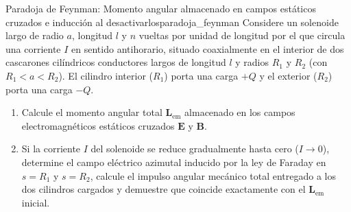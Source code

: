 \documentclass[11pt,a4paper]{book}
\newcommand{\Evec}{\bm{E}}
\newcommand{\Bvec}{\bm{B}}
\begin{document}
\begin{ejercicio}{Paradoja de Feynman: Momento angular almacenado en campos estáticos cruzados e inducción al desactivarlos}{paradoja_feynman}
Considere un solenoide largo de radio $a$, longitud $l$ y $n$ vueltas por unidad de longitud por el que circula una corriente $I$ en sentido antihorario, situado coaxialmente en el interior de dos cascarones cilíndricos conductores largos de longitud $l$ y radios $R_1$ y $R_2$ (con $R_1 < a < R_2$). El cilindro interior ($R_1$) porta una carga $+Q$ y el exterior ($R_2$) porta una carga $-Q$.
\begin{enumerate}[label=\alph*)]
    \item Calcule el momento angular total $\bm{L}_{\text{em}}$ almacenado en los campos electromagnéticos estáticos cruzados $\Evec$ y $\Bvec$.
    \item Si la corriente $I$ del solenoide se reduce gradualmente hasta cero ($I \to 0$), determine el campo eléctrico azimutal inducido por la ley de Faraday en $s = R_1$ y $s = R_2$, calcule el impulso angular mecánico total entregado a los dos cilindros cargados y demuestre que coincide exactamente con el $\bm{L}_{\text{em}}$ inicial.
\end{enumerate}
\end{ejercicio}
\end{document}

